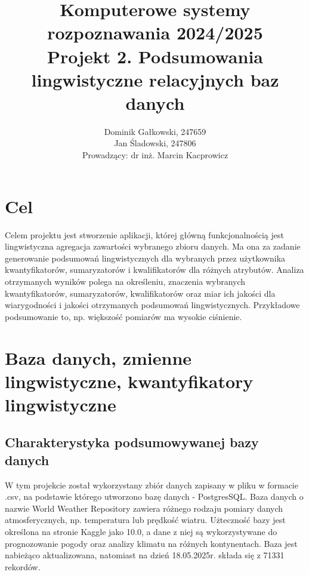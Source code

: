 \documentclass{article}
\author{
	{Dominik Gałkowski, 247659} \\
	{Jan Śladowski, 247806}\\ 
{Prowadzący: dr inż. Marcin Kacprowicz}
}
\title{Komputerowe systemy rozpoznawania 2024/2025\\Projekt 2. Podsumowania lingwistyczne relacyjnych baz danych}
\begin{document}
\maketitle 

\section{Cel}
Celem projektu jest stworzenie aplikacji, której główną funkcjonalnością
jest lingwistyczna agregacja zawartości wybranego zbioru danych. Ma ona za zadanie generowanie podsumowań lingwistycznych dla wybranych przez użytkownika kwantyfikatorów, sumaryzatorów i kwalifikatorów dla różnych atrybutów. Analiza otrzymanych wyników polega na określeniu, znaczenia wybranych kwantyfikatorów, sumaryzatorów, kwalifikatorów oraz miar ich jakości dla wiarygodności i jakości otrzymanych podsumowań lingwistycznych. Przykładowe podsumowanie to, np. większość pomiarów ma wysokie ciśnienie.


\section{Baza danych, zmienne lingwistyczne, kwantyfikatory lingwistyczne}

\subsection{Charakterystyka podsumowywanej bazy danych}
W tym projekcie został wykorzystany zbiór danych zapisany w pliku w formacie .csv, na podstawie którego utworzono bazę danych - PostgresSQL. Baza danych o nazwie World Weather Repository zawiera różnego rodzaju pomiary danych atmosferycznych, np. temperatura lub prędkość wiatru. \cite{baza} Użteczność bazy jest określona na stronie Kaggle jako 10.0, a dane z niej są wykorzystywane do prognozowanie pogody oraz analizy klimatu na różnych kontynentach. Baza jest nabieżąco aktualizowana, natomiast na dzień 18.05.2025r. składa się z 71331 rekordów. 
\end{document}
